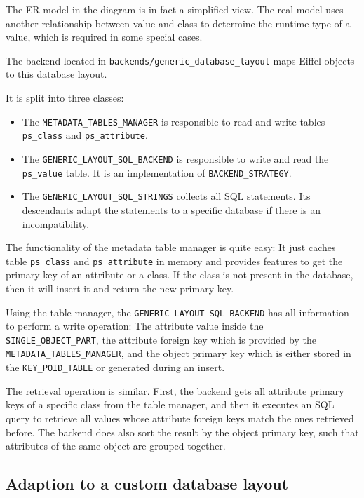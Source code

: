 The ER-model in the diagram is in fact a simplified view. 
The real model uses another relationship between value and class to determine the runtime type of a value, which is required in some special cases.

The backend located in \lstinline!backends/generic_database_layout! maps Eiffel objects to this database layout.

It is split into three classes:
\begin{itemize}
 \item The \lstinline!METADATA_TABLES_MANAGER! is responsible to read and write tables \lstinline!ps_class! and \lstinline!ps_attribute!.
 \item The \lstinline!GENERIC_LAYOUT_SQL_BACKEND! is responsible to write and read the \lstinline!ps_value! table. It is an implementation of \lstinline!BACKEND_STRATEGY!.
 \item The \lstinline!GENERIC_LAYOUT_SQL_STRINGS! collects all SQL statements. Its descendants adapt the statements to a specific database if there is an incompatibility.
\end{itemize}

The functionality of the metadata table manager is quite easy:
It just caches table \lstinline!ps_class! and \lstinline!ps_attribute! in memory and provides features to get the primary key of an attribute or a class.
If the class is not present in the database, then it will insert it and return the new primary key.

Using the table manager, the \lstinline!GENERIC_LAYOUT_SQL_BACKEND! has all information to perform a write operation:
The attribute value inside the \lstinline!SINGLE_OBJECT_PART!, the attribute foreign key which is provided by the \lstinline!METADATA_TABLES_MANAGER!, 
and the object primary key which is either stored in the \lstinline!KEY_POID_TABLE! or generated during an insert.

The retrieval operation is similar.
First, the backend gets all attribute primary keys of a specific class from the table manager, and then it executes an SQL query to retrieve all values whose attribute foreign keys match the ones retrieved before.
The backend does also sort the result by the object primary key, such that attributes of the same object are grouped together.


\subsection{Adaption to a custom database layout}
\label{subsection:specific_adaption}

